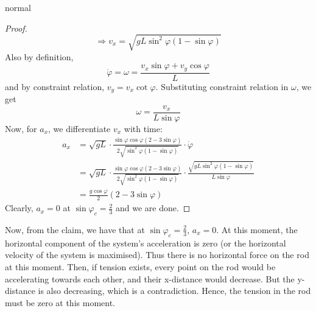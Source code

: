 \begin{solution}{normal}
\begin{proof}
$$\Rightarrow v_x = \sqrt{gL \sin^{2}{\varphi}{(1-\sin{\varphi})}}$$ Also by definition, $$\dot{\varphi} = \omega = \frac{v_x \sin{\varphi} + v_y \cos{\varphi}}{L}$$ and by constraint relation, $v_y = v_x \cot{\varphi}$. Substituting constraint relation in $\omega$, we get $$\omega = \frac{v_x}{L \sin{\varphi}}$$ Now, for $a_x$, we differentiate $v_x$ with time: 
\begin{align*}
a_x &= \sqrt{gL} \cdot {\frac{\sin{\varphi} \cos{\varphi} (2-3\sin{\varphi})}{2\sqrt{\sin^{2}{\varphi}{(1-\sin{\varphi})}}}} \cdot \dot{\varphi} \\
&= \sqrt{gL} \cdot {\frac{\sin{\varphi} \cos{\varphi} (2-3\sin{\varphi})}{2\sqrt{\sin^{2}{\varphi}{(1-\sin{\varphi})}}}} \cdot \frac{\sqrt{gL \sin^{2}{\varphi}{(1-\sin{\varphi})}}}{L \sin{\varphi}} \\
&= \frac{g{\cos{\varphi}}}{2}{ (2-3\sin{\varphi})}
\end{align*}
Clearly,  $a_x=0$ at $\sin{\varphi_c} = \frac{2}{3}$ and we are done.
\end{proof}
Now, from the claim, we have that at $\sin{\varphi_c} = \frac{2}{3}$, $a_x=0$. At this moment, the horizontal component of the system's acceleration is zero (or the horizontal velocity of the system is maximised). Thus there is no horizontal force on the rod at this moment. Then, if tension exists, every point on the rod would be accelerating towards each other, and their x-distance would decrease. But the y-distance is also decreasing, which is a contradiction. Hence, the tension in the rod must be zero at this moment. 

\tcbline


\end{solution}
